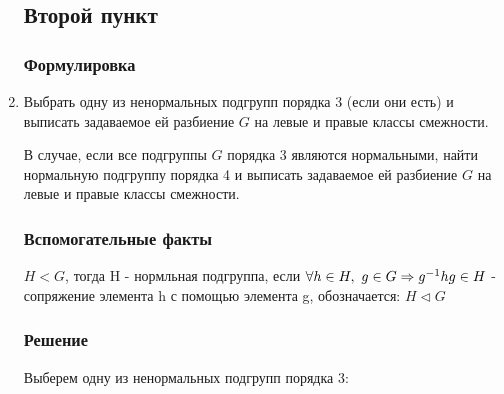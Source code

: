 \documentclass[11pt, fleqn]{article}
\begin{document}
\begin{enumerate}
      \subsection{Второй пункт}
      \subsubsection{Формулировка}
      \item Выбрать одну из ненормальных подгрупп порядка 3 (если они есть) и выписать задаваемое ей разбиение $G$ на левые и правые классы смежности.

      В случае, если все подгруппы $G$ порядка 3 являются нормальными, найти нормальную подгруппу порядка 4 и выписать задаваемое ей разбиение $G$ на левые и правые классы смежности.
      \subsubsection{Вспомогательные факты}

      \begin{definition}
  		    $H<G$, тогда H - нормльная подгруппа, если $\forall h \in H,\ g \in G \Rightarrow g^{-1}h g \in H$ - сопряжение элемента h с помощью элемента g, обозначается: $H \triangleleft G$
  		\end{definition}

      \subsubsection{Решение}
      Выберем одну из ненормальных подгрупп порядка 3:


\end{enumerate}
\end{document}
